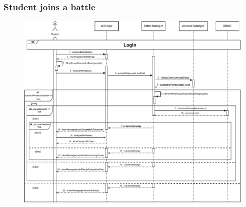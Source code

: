 \documentclass{article}
\begin{document}
{    \subsubsection{Student joins a battle}
        \begin{figure}[H]
            \centering
            \hspace*{-2.1cm}\includegraphics[scale=0.7]{Sequence/Sequence10DD.pdf}
            \caption{}
            \label{fig:Sequence10DD}
        \end{figure}
        

}
\end{document}
